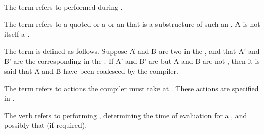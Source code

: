 The term  refers to 
performed during .

The term  refers to 
     a quoted  
  or a  
  or an  that is a substructure of such an .
A  is not itself a .
 
The term  is defined as follows.
Suppose \f{A} and \f{B} are two  in the ,
and that \f{A'} and \f{B'} are the corresponding  in the .
If \f{A'} and \f{B'} are  but
\f{A} and \f{B} are not , then it is said
that \f{A} and \f{B} have been coalesced by the compiler.

The term  refers to actions the compiler
must take at . These actions are specified in 
\secref\CompilationSemantics.

The verb  refers to performing ,
determining the time of evaluation for a ,
and possibly  that  (if required).

